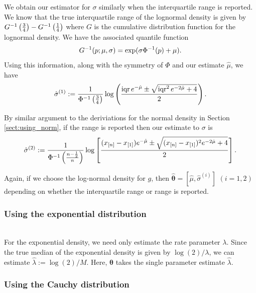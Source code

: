 \documentclass{article}
\begin{document}
We obtain our estimator for $\sigma$ similarly when the interquartile range is reported. We know that the true interquartile range of the lognormal density is given by $G^{-1}\left(\frac 3 4\right) - G^{-1}\left(\frac 1 4\right)$ where $G$ is the cumulative distribution function for the lognormal density. We have the associated quantile function
\[
G^{-1}(p; \mu, \sigma) = \exp(\sigma\Phi^{-1}(p) + \mu).
\]
Using this information, along with the symmetry of $\Phi$ and our estimate $\hat \mu$, we have
\begin{equation*}\label{sigma-hat}
\hat{\sigma}^{(1)} := \frac 1 {\Phi^{-1}\left(\frac 3 4\right)} \log\left(\frac {\operatorname{iqr} e^{- \hat \mu} \pm
\sqrt{\operatorname{iqr}^2 e^{-2 \hat \mu} + 4}
} {2}\right).
\end{equation*}

By similar argument to the deriviations for the normal density in Section \ref{sect:using_norm}, if the range is reported then our estimate to $\sigma$ is
\begin{equation*}\label{sigma-hat-range}
\hat{\sigma}^{(2)} := \frac 1 {\Phi^{-1}\left(\frac {n - \frac 1 2} n\right)} \log\left[\frac {(x_{[n]} - x_{[1]}) e^{- \hat \mu} \pm
\sqrt{(x_{[n]} - x_{[1]})^2 e^{-2\hat \mu} + 4}
} {2}\right].
\end{equation*}

Again, if we choose the log-normal density for $g$, then $\hat{\bm{\theta}}=[\hat \mu, \hat{\sigma}^{(i)}]$ $(i=1,2)$ depending on whether the interquartile range or range is reported.

\subsubsection{Using the exponential distribution} ~\\

\noindent For the exponential density, we need only estimate the rate parameter $\lambda$. Since the true median of the exponential density is given by $\log (2)/ \lambda$, we can estimate $\hat\lambda := \log (2)/ M$.  Here, $\bm{\hat \theta}$ takes the single parameter estimate $\hat \lambda$.

\subsubsection{Using the Cauchy distribution}~\\
\end{document}
